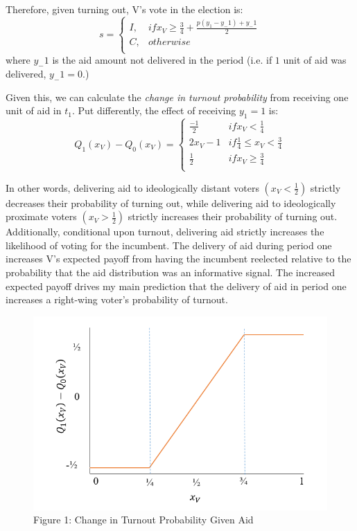 \documentclass[12pt]{paper}
\begin{document}
Therefore, given turning out, V’s vote in the election is:
\begin{equation}
s =
\begin{cases}
I, & if x_V \geq \frac{3}{4} + \frac{p(y_1 - y_-1) + y_-1}{2} \\    
C,     & otherwise  \\
\end{cases}
\end{equation}
where $y_-1$ is the aid amount not delivered in the period (i.e. if $1$ unit of aid was delivered, $y_-1 = 0$.)

Given this, we can calculate the \emph{change in turnout probability} from receiving one unit of aid in $t_1$. Put differently, the effect of receiving $y_1 = 1$ is:
\begin{equation}
Q_1 (x_V ) - Q_0 (x_V )=
\begin{cases}
\frac{-1}{2} & if x_V < \frac{1}{4}\\    
2x_V - 1 & if \frac{1}{4} \leq x_V < \frac{3}{4}  \\
\frac{1}{2} & if x_V \geq \frac{3}{4}  \\
\end{cases}
\end{equation}

In other words, delivering aid to ideologically distant voters $(x_V < \frac{1}{2})$ strictly decreases their probability of turning out, while delivering aid to ideologically proximate voters $(x_V > \frac{1}{2})$  strictly increases their probability of turning out. Additionally, conditional upon turnout, delivering aid strictly increases the likelihood of voting for the incumbent. The delivery of aid during period one increases V’s expected payoff from having the incumbent reelected relative to the probability that the aid distribution was an informative signal. The increased expected payoff drives my main prediction that the delivery of aid in period one increases a right-wing voter's probability of turnout.

\begin{figure}
	\includegraphics[width=\linewidth]{Figs/equilibrium.png}
	\caption{Figure 1: Change in Turnout Probability Given Aid}
	\label{Figure 1: Change in Turnout Probability Given Aid}
\end{figure}
\end{document}
